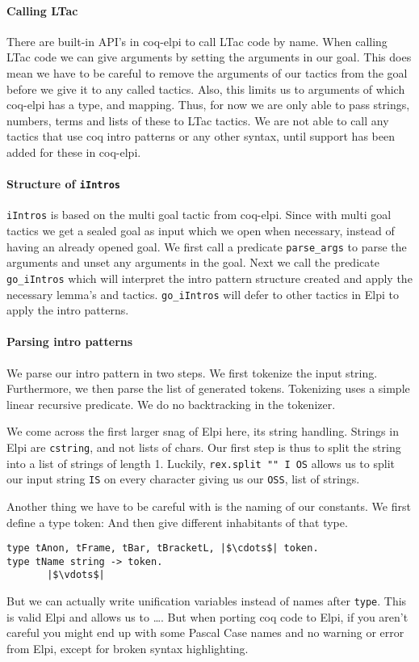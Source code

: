 \documentclass[thesis.tex]{subfiles}
\begin{document}
{{{\paragraph*{Calling LTac}
There are built-in API's in coq-elpi to call LTac code by name. When calling LTac code we can give arguments by setting the arguments in our goal. This does mean we have to be careful to remove the arguments of our tactics from the goal before we give it to any called tactics. Also, this limits us to arguments of which coq-elpi has a type, and mapping. Thus, for now we are only able to pass strings, numbers, terms and lists of these to LTac tactics. We are not able to call any tactics that use coq intro patterns or any other syntax, until support has been added for these in coq-elpi.

\paragraph*{Structure of \texttt{iIntros}}
\texttt{iIntros} is based on the multi goal tactic from coq-elpi. Since with multi goal tactics we get a sealed goal as input which we open when necessary, instead of having an already opened goal. We first call a predicate \texttt{parse_args} to parse the arguments and unset any arguments in the goal. Next we call the predicate \texttt{go_iIntros} which will interpret the intro pattern structure created and apply the necessary lemma's and tactics. \texttt{go_iIntros} will defer to other tactics in Elpi to apply the intro patterns.

\paragraph*{Parsing intro patterns}
We parse our intro pattern in two steps. We first tokenize the input string. Furthermore, we then parse the list of generated tokens. Tokenizing uses a simple linear recursive predicate. We do no backtracking in the tokenizer.

We come across the first larger snag of Elpi here, its string handling. Strings in Elpi are \texttt{cstring}, and not lists of chars. Our first step is thus to split the string into a list of strings of length 1. Luckily, \texttt{rex.split "" I OS} allows us to split our input string \texttt{IS} on every character giving us our \texttt{OSS}, list of strings.

Another thing we have to be careful with is the naming of our constants. We first define a type token:  And then give different inhabitants of that type.
\begin{verbatim}
type tAnon, tFrame, tBar, tBracketL, |$\cdots$| token.
type tName string -> token.
       |$\vdots$|
\end{verbatim}
But we can actually write unification variables instead of names after \texttt{type}. This is valid Elpi and allows us to \dots. But when porting coq code to Elpi, if you aren't careful you might end up with some Pascal Case names and no warning or error from Elpi, except for broken syntax highlighting.

}}}
\end{document}
